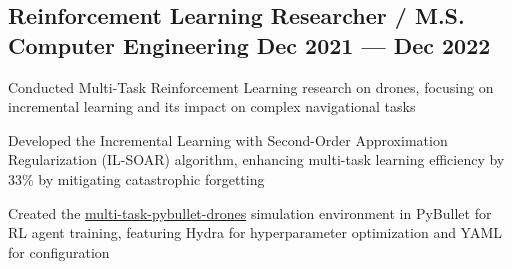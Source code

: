 \subsection{{Reinforcement Learning Researcher / M.S. Computer Engineering  \hfill Dec 2021 --- Dec 2022}}
\begin{zitemize}
	\item Conducted Multi-Task Reinforcement Learning research on drones, focusing on incremental learning and its impact on complex navigational tasks
	\item Developed the Incremental Learning with Second-Order Approximation Regularization (IL-SOAR) algorithm, enhancing multi-task learning efficiency by 33\% by mitigating catastrophic forgetting
	\item Created the \href{https://github.com/trangml/multi-task-pybullet-drones}{multi-task-pybullet-drones} simulation environment in PyBullet for RL agent training, featuring Hydra for hyperparameter optimization and YAML for configuration
\end{zitemize}

